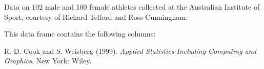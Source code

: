 \begin{Description}\relax
Data on 102 male and 100 female athletes collected at the Australian
Institute of Sport, courtesy of Richard Telford and Ross Cunningham.\end{Description}
\begin{Format}\relax
This data frame contains the following columns:
\end{Format}
\begin{Details}\relax
\end{Details}
\begin{Source}\relax
R. D. Cook and S. Weisberg (1999). \emph{Applied
Statistics Including Computing and Graphics}.  New York:  Wiley.\end{Source}

